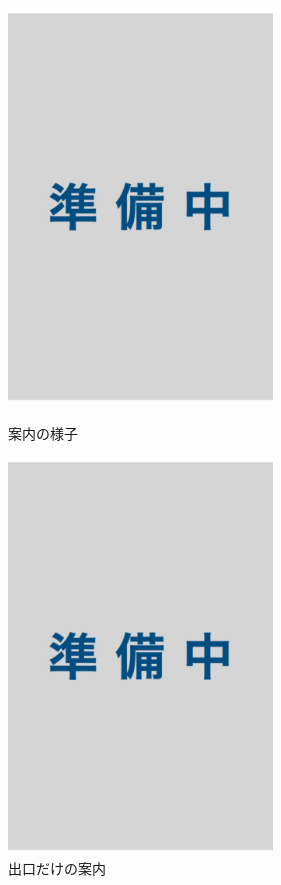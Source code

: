 \begin{figure}[htbp]
  \begin{minipage}{0.5\hsize}
    \centering
    \includegraphics[width=70mm]{images/wip2.jpg}
    \caption{案内の様子} \label{fig:ar_navigation_shonandai}
  \end{minipage}
  \begin{minipage}{0.5\hsize}
    \centering
    \includegraphics[width=70mm]{images/wip2.jpg}
    \caption{出口だけの案内} \label{fig:ar_navigation_exit}
  \end{minipage}
\end{figure}

